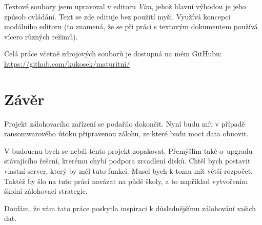 \documentclass[a4paper,12pt, oneside]{book}
\begin{document}
Textové soubory jsem upravoval v editoru \emph{Vim}, jehož hlavní výhodou je
jeho způsob ovládání. Text se zde edituje bez
použití myši. Využívá koncepci modálního editoru (to znamená, že se při
práci s textovým dokumentem používá vícero různých režimů).
\cite{Vim-Wikipedia}

Celá práce včetně zdrojových souborů je dostupná na mém GitHubu:
\url{https://github.com/kukosek/maturitni/}




\chapter{Závěr}


Projekt zálohovacího zařízení se podařilo dokončit. 
Nyní budu mít v případě ransomwarového útoku připravenou zálohu,
ze které budu moct data obnovit.

V budoucnu bych se nebál tento projekt zopakovat. Přemýšlím také o upgradu
stávajícího řešení, kterému chybí podpora zrcadlení disků. Chtěl bych postavit
vlastní server, který by měl tuto funkci. Musel bych k tomu mít větší
rozpočet. Taktéž by šlo na tuto práci navázat na půdě školy, a to například
vytvořením školní zálohovací strategie.

Doufám, že vám tato práce poskytla inspiraci k důslednějšímu zálohování vašich
dat.



\nocite{*}
\printbibliography[
	heading=bibintoc,
	title={Seznam zdrojů}
]

\cleardoublepage
\listoffigures
{}
\end{document}

